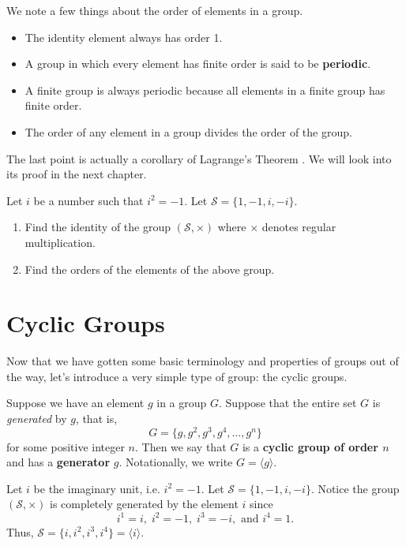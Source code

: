 We note a few things about the order of elements in a group.
\begin{itemize}
    \item The identity element always has order 1.
    \item A group in which every element has finite order is said to be \textbf{periodic}.
    \item A finite group is always periodic because all elements in a finite group has finite order.
    \item The order of any element in a group divides the order of the group.
\end{itemize}
The last point is actually a corollary of Lagrange's Theorem . We will look into its proof in the next chapter.

\begin{exercise}
    Let $i$ be a number such that $i^2 = -1$. Let $\mathcal{S} = \{1, -1, i, -i\}$.
    \begin{enumerate}[label=(\roman*)]
        \item Find the identity of the group $(\mathcal{S}, \times)$ where $\times$ denotes regular multiplication.
        \item Find the orders of the elements of the above group.
    \end{enumerate}
\end{exercise}

\newpage

\section{Cyclic Groups}
Now that we have gotten some basic terminology and properties of groups out of the way, let's introduce a very simple type of group: the cyclic groups.

Suppose we have an element $g$ in a group $G$. Suppose that the entire set $G$ is \textit{generated} by $g$, that is,
\[
    G = \{g, g^2, g^3, g^4, \dots, g^n\}
\]
for some positive integer $n$. Then we say that $G$ is a \textbf{cyclic group of order $n$} and has a \textbf{generator} $g$. Notationally, we write $G = \langle g \rangle$.

\begin{example}
    Let $i$ be the imaginary unit, i.e. $i^2 = -1$. Let $\mathcal{S} = \{1, -1, i, -i\}$. Notice the group $(\mathcal{S}, \times)$ is completely generated by the element $i$ since
    \[
    i^1 = i,\; i^2 = -1,\; i^3 = -i, \text{ and } i^4 = 1.
    \]
    Thus, $\mathcal{S} = \{i, i^2, i^3, i^4\} = \langle i \rangle$.
\end{example}


